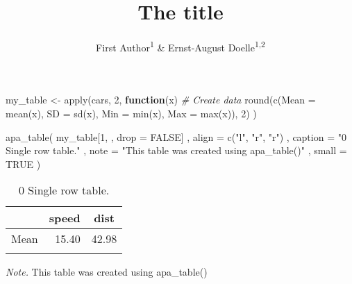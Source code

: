 \documentclass[
  english,
  man]{apa6}
\title{The title}
\author{First Author\textsuperscript{1} \& Ernst-August Doelle\textsuperscript{1,2}}
\date{}
\affiliation{\vspace{0.5cm}\textsuperscript{1} Wilhelm-Wundt-University\\\textsuperscript{2} Konstanz Business School}
\newenvironment{Shaded}{\begin{snugshade}}{\end{snugshade}}
\newcommand{\AttributeTok}[1]{\textcolor[rgb]{0.77,0.63,0.00}{#1}}
\newcommand{\CommentTok}[1]{\textcolor[rgb]{0.56,0.35,0.01}{\textit{#1}}}
\newcommand{\ConstantTok}[1]{\textcolor[rgb]{0.00,0.00,0.00}{#1}}
\newcommand{\ControlFlowTok}[1]{\textcolor[rgb]{0.13,0.29,0.53}{\textbf{#1}}}
\newcommand{\DecValTok}[1]{\textcolor[rgb]{0.00,0.00,0.81}{#1}}
\newcommand{\FunctionTok}[1]{\textcolor[rgb]{0.00,0.00,0.00}{#1}}
\newcommand{\NormalTok}[1]{#1}
\newcommand{\OtherTok}[1]{\textcolor[rgb]{0.56,0.35,0.01}{#1}}
\newcommand{\StringTok}[1]{\textcolor[rgb]{0.31,0.60,0.02}{#1}}
\begin{document}
\maketitle

\begin{Shaded}
\begin{Highlighting}[]
\NormalTok{my\_table }\OtherTok{\textless{}{-}} \FunctionTok{apply}\NormalTok{(cars, }\DecValTok{2}\NormalTok{, }\ControlFlowTok{function}\NormalTok{(x) }\CommentTok{\# Create data}
  \FunctionTok{round}\NormalTok{(}\FunctionTok{c}\NormalTok{(}\AttributeTok{Mean =} \FunctionTok{mean}\NormalTok{(x), }\AttributeTok{SD =} \FunctionTok{sd}\NormalTok{(x), }\AttributeTok{Min =} \FunctionTok{min}\NormalTok{(x), }\AttributeTok{Max =} \FunctionTok{max}\NormalTok{(x)), }\DecValTok{2}\NormalTok{)}
\NormalTok{)}

\FunctionTok{apa\_table}\NormalTok{(}
\NormalTok{  my\_table[}\DecValTok{1}\NormalTok{, , }\AttributeTok{drop =} \ConstantTok{FALSE}\NormalTok{]}
\NormalTok{  , }\AttributeTok{align =} \FunctionTok{c}\NormalTok{(}\StringTok{"l"}\NormalTok{, }\StringTok{"r"}\NormalTok{, }\StringTok{"r"}\NormalTok{)}
\NormalTok{  , }\AttributeTok{caption =} \StringTok{"0 Single row table."}
\NormalTok{  , }\AttributeTok{note =} \StringTok{"This table was created using apa\_table()"}
\NormalTok{  , }\AttributeTok{small =} \ConstantTok{TRUE}
\NormalTok{)}
\end{Highlighting}
\end{Shaded}

\begin{table}[tbp]

\begin{center}
\begin{threeparttable}

\caption{\label{tab:unnamed-chunk-2}0 Single row table.}

\small{

\begin{tabular}{lrr}
\toprule
 & \multicolumn{1}{c}{speed} & \multicolumn{1}{c}{dist}\\
\midrule
Mean & 15.40 & 42.98\\
\bottomrule
\addlinespace
\end{tabular}

}

\begin{tablenotes}[para]
\normalsize{\textit{Note.} This table was created using apa\_table()}
\end{tablenotes}

\end{threeparttable}
\end{center}

\end{table}
\end{document}
